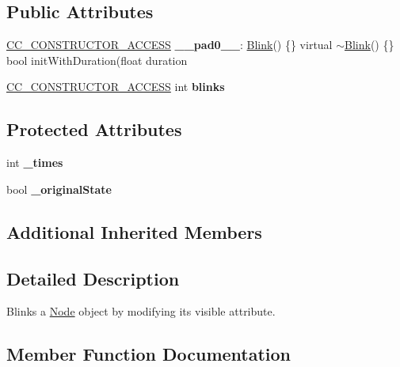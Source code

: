 \subsection*{Public Attributes}
\begin{DoxyCompactItemize}
\item 
\mbox{\label{classBlink_a2f2a3fb689c9a6d30f5b7f8b534546eb}} 
\hyperlink{_2cocos2d_2cocos_2base_2ccConfig_8h_a25ef1314f97c35a2ed3d029b0ead6da0}{C\+C\+\_\+\+C\+O\+N\+S\+T\+R\+U\+C\+T\+O\+R\+\_\+\+A\+C\+C\+E\+SS} {\bfseries \+\_\+\+\_\+pad0\+\_\+\+\_\+}\+: \hyperlink{classBlink}{Blink}() \{\} virtual $\sim$\hyperlink{classBlink}{Blink}() \{\} bool init\+With\+Duration(float duration
\item 
\mbox{\label{classBlink_a92fadeea492071b30037cc7c6195f055}} 
\hyperlink{_2cocos2d_2cocos_2base_2ccConfig_8h_a25ef1314f97c35a2ed3d029b0ead6da0}{C\+C\+\_\+\+C\+O\+N\+S\+T\+R\+U\+C\+T\+O\+R\+\_\+\+A\+C\+C\+E\+SS} int {\bfseries blinks}
\end{DoxyCompactItemize}
\subsection*{Protected Attributes}
\begin{DoxyCompactItemize}
\item 
\mbox{\label{classBlink_a4e32c61ff7bf36c1b2ee6d3e8b18d499}} 
int {\bfseries \+\_\+times}
\item 
\mbox{\label{classBlink_a535a2679c26a1a15349ed30456e55aae}} 
bool {\bfseries \+\_\+original\+State}
\end{DoxyCompactItemize}
\subsection*{Additional Inherited Members}


\subsection{Detailed Description}
Blinks a \hyperlink{classNode}{Node} object by modifying it\textquotesingle{}s visible attribute. 

\subsection{Member Function Documentation}
\mbox{\label{classBlink_a01f5110523a8984f73a447cac74f1121}} 
